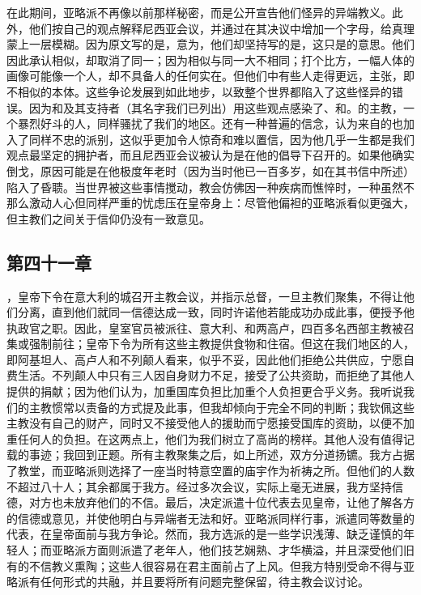 在此期间，亚略派不再像以前那样秘密，而是公开宣告他们怪异的异端教义。此外，他们按自己的观点解释尼西亚会议，并通过在其决议中增加一个字母，给真理蒙上一层模糊。因为原文写的是，意为，他们却坚持写的是，这只是的意思。他们因此承认相似，却取消了同一；因为相似与同一大不相同；打个比方，一幅人体的画像可能像一个人，却不具备人的任何实在。但他们中有些人走得更远，主张，即不相似的本体。这些争论发展到如此地步，以致整个世界都陷入了这些怪异的错误。因为和及其支持者（其名字我们已列出）用这些观点感染了、和。的主教，一个暴烈好斗的人，同样骚扰了我们的地区。还有一种普遍的信念，认为来自的也加入了同样不忠的派别，这似乎更加令人惊奇和难以置信，因为他几乎一生都是我们观点最坚定的拥护者，而且尼西亚会议被认为是在他的倡导下召开的。如果他确实倒戈，原因可能是在他极度年老时（因为当时他已一百多岁，如在其书信中所述）陷入了昏聩。当世界被这些事情搅动，教会仿佛因一种疾病而憔悴时，一种虽然不那么激动人心但同样严重的忧虑压在皇帝身上：尽管他偏袒的亚略派看似更强大，但主教们之间关于信仰仍没有一致意见。\par


\subsection{第四十一章}

，皇帝下令在意大利的城召开主教会议，并指示总督，一旦主教们聚集，不得让他们分离，直到他们就同一信德达成一致，同时许诺他若能成功办成此事，便授予他执政官之职。因此，皇室官员被派往、意大利、和两高卢，四百多名西部主教被召集或强制前往；皇帝下令为所有这些主教提供食物和住宿。但这在我们地区的人，即阿基坦人、高卢人和不列颠人看来，似乎不妥，因此他们拒绝公共供应，宁愿自费生活。不列颠人中只有三人因自身财力不足，接受了公共资助，而拒绝了其他人提供的捐献；因为他们认为，加重国库负担比加重个人负担更合乎义务。我听说我们的主教惯常以责备的方式提及此事，但我却倾向于完全不同的判断；我钦佩这些主教没有自己的财产，同时又不接受他人的援助而宁愿接受国库的资助，以便不加重任何人的负担。在这两点上，他们为我们树立了高尚的榜样。其他人没有值得记载的事迹；我回到正题。所有主教聚集之后，如上所述，双方分道扬镳。我方占据了教堂，而亚略派则选择了一座当时特意空置的庙宇作为祈祷之所。但他们的人数不超过八十人；其余都属于我方。经过多次会议，实际上毫无进展，我方坚持信德，对方也未放弃他们的不信。最后，决定派遣十位代表去见皇帝，让他了解各方的信德或意见，并使他明白与异端者无法和好。亚略派同样行事，派遣同等数量的代表，在皇帝面前与我方争论。然而，我方选派的是一些学识浅薄、缺乏谨慎的年轻人；而亚略派方面则派遣了老年人，他们技艺娴熟、才华横溢，并且深受他们旧有的不信教义熏陶；这些人很容易在君主面前占了上风。但我方特别受命不得与亚略派有任何形式的共融，并且要将所有问题完整保留，待主教会议讨论。\par

